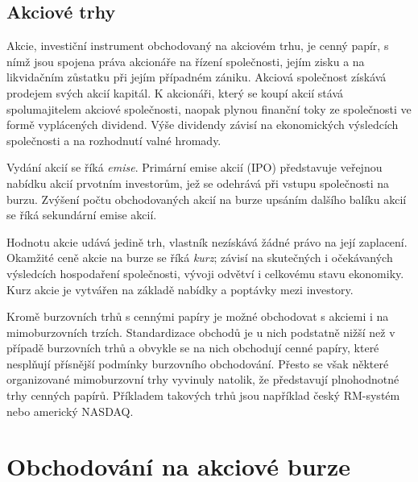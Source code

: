 \documentclass[thesis=M,czech]{FITthesis}[2012/06/26]
\begin{document}


\subsection{Akciové trhy}
	
Akcie, investiční instrument obchodovaný na akciovém trhu, je cenný papír, s nímž jsou spojena práva akcionáře na 
řízení společnosti, jejím zisku a na likvidačním zůstatku při jejím případném zániku. Akciová společnost získává 
prodejem svých akcií kapitál. K akcionáři, který se koupí akcií stává spolumajitelem akciové společnosti, naopak 
plynou finanční toky ze společnosti ve formě vyplácených dividend. Výše dividendy závisí na ekonomických výsledcích 
společnosti a na rozhodnutí valné hromady. \cite{htsmw} %

Vydání akcií se říká \textit{emise}. Primární emise akcií (IPO) představuje veřejnou nabídku akcií prvotním investorům, 
jež se odehrává při vstupu společnosti na burzu. Zvýšení počtu obchodovaných akcií na burze upsáním dalšího balíku 
akcií se říká sekundární emise akcií.

Hodnotu akcie udává jedině trh, vlastník nezískává žádné právo na její zaplacení. Okamžité ceně akcie na burze se 
říká \textit{kurz}; závisí na skutečných i očekávaných výsledcích hospodaření společnosti, vývoji odvětví i celkovému stavu 
ekonomiky. Kurz akcie je vytvářen na základě nabídky a poptávky mezi investory. \cite{prknab} %

Kromě burzovních trhů s cennými papíry je možné obchodovat s akciemi i na mimoburzovních trzích. Standardizace 
obchodů je u nich podstatně nižší než v případě burzovních trhů a obvykle se na nich obchodují cenné papíry, které 
nesplňují přísnější podmínky burzovního obchodování. Přesto se však některé organizované mimoburzovní trhy vyvinuly 
natolik, že představují plnohodnotné trhy cenných papírů. Příkladem takových trhů jsou například český RM-systém 
nebo americký NASDAQ. %


\section{Obchodování na akciové burze}
\label{sec:13}
\end{document}
